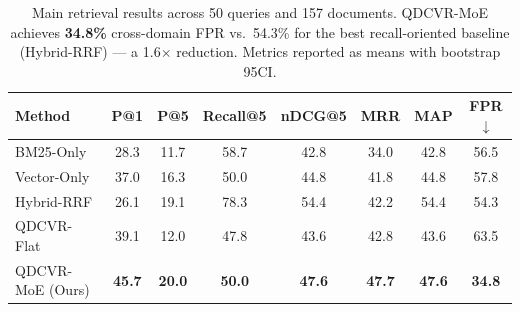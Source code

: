 \begin{table}[t]
\centering
\caption{Main retrieval results across 50 queries and 157 documents. QDCVR-MoE achieves \textbf{34.8\%} cross-domain FPR vs.\ 54.3\% for the best recall-oriented baseline (Hybrid-RRF) — a 1.6$\times$ reduction. Metrics reported as means with bootstrap 95\textperthousand CI.}
\label{tab:main}
\begin{tabular}{lccccccc}
\toprule
\textbf{Method} & \textbf{P@1} & \textbf{P@5} & \textbf{Recall@5} & \textbf{nDCG@5} & \textbf{MRR} & \textbf{MAP} & \textbf{FPR$\downarrow$} \\
\midrule
    BM25-Only                & 28.3 & 11.7 & 58.7 & 42.8 & 34.0 & 42.8 & 56.5 \\
    Vector-Only              & 37.0 & 16.3 & 50.0 & 44.8 & 41.8 & 44.8 & 57.8 \\
    Hybrid-RRF               & 26.1 & 19.1 & 78.3 & 54.4 & 42.2 & 54.4 & 54.3 \\
    QDCVR-Flat               & 39.1 & 12.0 & 47.8 & 43.6 & 42.8 & 43.6 & 63.5 \\
    QDCVR-MoE (Ours)         & \textbf{45.7} & \textbf{20.0} & \textbf{50.0} & \textbf{47.6} & \textbf{47.7} & \textbf{47.6} & \textbf{34.8} \\
\bottomrule
\end{tabular}
\end{table}
